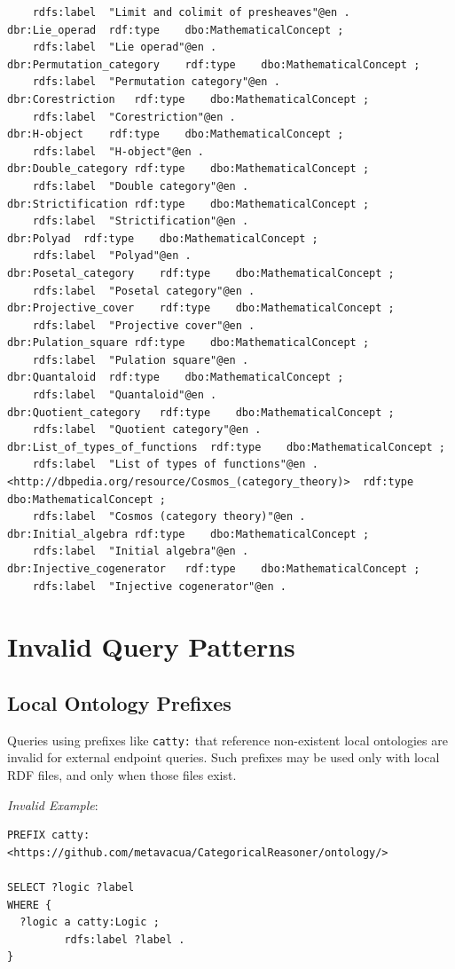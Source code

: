 \begin{verbatim}
	rdfs:label	"Limit and colimit of presheaves"@en .
dbr:Lie_operad	rdf:type	dbo:MathematicalConcept ;
	rdfs:label	"Lie operad"@en .
dbr:Permutation_category	rdf:type	dbo:MathematicalConcept ;
	rdfs:label	"Permutation category"@en .
dbr:Corestriction	rdf:type	dbo:MathematicalConcept ;
	rdfs:label	"Corestriction"@en .
dbr:H-object	rdf:type	dbo:MathematicalConcept ;
	rdfs:label	"H-object"@en .
dbr:Double_category	rdf:type	dbo:MathematicalConcept ;
	rdfs:label	"Double category"@en .
dbr:Strictification	rdf:type	dbo:MathematicalConcept ;
	rdfs:label	"Strictification"@en .
dbr:Polyad	rdf:type	dbo:MathematicalConcept ;
	rdfs:label	"Polyad"@en .
dbr:Posetal_category	rdf:type	dbo:MathematicalConcept ;
	rdfs:label	"Posetal category"@en .
dbr:Projective_cover	rdf:type	dbo:MathematicalConcept ;
	rdfs:label	"Projective cover"@en .
dbr:Pulation_square	rdf:type	dbo:MathematicalConcept ;
	rdfs:label	"Pulation square"@en .
dbr:Quantaloid	rdf:type	dbo:MathematicalConcept ;
	rdfs:label	"Quantaloid"@en .
dbr:Quotient_category	rdf:type	dbo:MathematicalConcept ;
	rdfs:label	"Quotient category"@en .
dbr:List_of_types_of_functions	rdf:type	dbo:MathematicalConcept ;
	rdfs:label	"List of types of functions"@en .
<http://dbpedia.org/resource/Cosmos_(category_theory)>	rdf:type	dbo:MathematicalConcept ;
	rdfs:label	"Cosmos (category theory)"@en .
dbr:Initial_algebra	rdf:type	dbo:MathematicalConcept ;
	rdfs:label	"Initial algebra"@en .
dbr:Injective_cogenerator	rdf:type	dbo:MathematicalConcept ;
	rdfs:label	"Injective cogenerator"@en .
\end{verbatim}

\section{Invalid Query Patterns}

\subsection{Local Ontology Prefixes}

Queries using prefixes like \texttt{catty:} that reference non-existent local ontologies are invalid for external endpoint queries. Such prefixes may be used only with local RDF files, and only when those files exist.

\textit{Invalid Example}:
\begin{verbatim}
PREFIX catty: <https://github.com/metavacua/CategoricalReasoner/ontology/>

SELECT ?logic ?label
WHERE {
  ?logic a catty:Logic ;
         rdfs:label ?label .
}
\end{verbatim}

